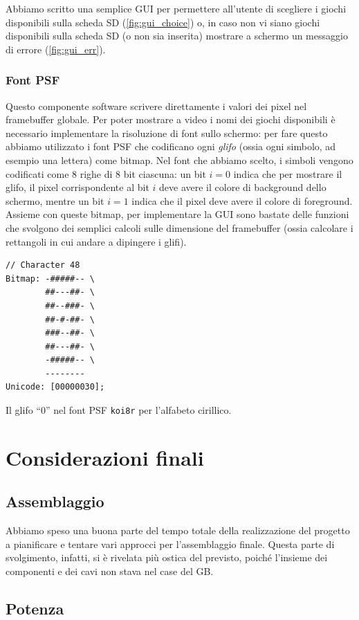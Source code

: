 \documentclass[hidelinks,12pt]{article}
\begin{document}
Abbiamo scritto una semplice GUI per permettere all'utente di scegliere i giochi
disponibili sulla scheda SD (\cref{fig:gui_choice}) o, in caso non vi siano
giochi disponibili sulla scheda SD (o non sia inserita) mostrare a schermo un
messaggio di errore (\cref{fig:gui_err}). 

\subsubsection{Font PSF}
Questo componente software scrivere direttamente i valori dei pixel nel
framebuffer globale. Per poter mostrare a video i nomi dei giochi disponibili è
necessario implementare la risoluzione di font sullo schermo: per fare questo
abbiamo utilizzato i font PSF che codificano ogni \textit{glifo} (ossia ogni
simbolo, ad esempio una lettera) come bitmap. Nel font che abbiamo scelto, i
simboli vengono codificati come $8$ righe di $8$ bit ciascuna: un bit $i = 0$
indica che per mostrare il glifo, il pixel corrispondente al bit $i$ deve avere
il colore di background dello schermo, mentre un bit $i = 1$ indica che il pixel
deve avere il colore di foreground. Assieme con queste bitmap, per implementare
la GUI sono bastate delle funzioni che svolgono dei  semplici calcoli sulle
dimensione del framebuffer (ossia calcolare i rettangoli in cui andare a
dipingere i glifi). 
\begin{table}[h]
  \begin{verbatim}
// Character 48
Bitmap: -#####-- \
        ##---##- \
        ##--###- \
        ##-#-##- \
        ###--##- \
        ##---##- \
        -#####-- \
        --------
Unicode: [00000030];
  \end{verbatim}
  \caption{Il glifo ``0'' nel font PSF \texttt{koi8r} per l'alfabeto cirillico.}
\end{table}

\section{Considerazioni finali}
\subsection{Assemblaggio}
Abbiamo speso una buona parte del tempo totale della realizzazione del progetto
a pianificare e tentare vari approcci per l'assemblaggio finale. Questa parte di
svolgimento, infatti, si è rivelata più ostica del previsto, poiché l'insieme
dei componenti e dei cavi non stava nel case del GB. 

\subsection{Potenza}




\addcontentsline{toc}{section}{References}
\nocite{*}
\printbibliography
\end{document}
